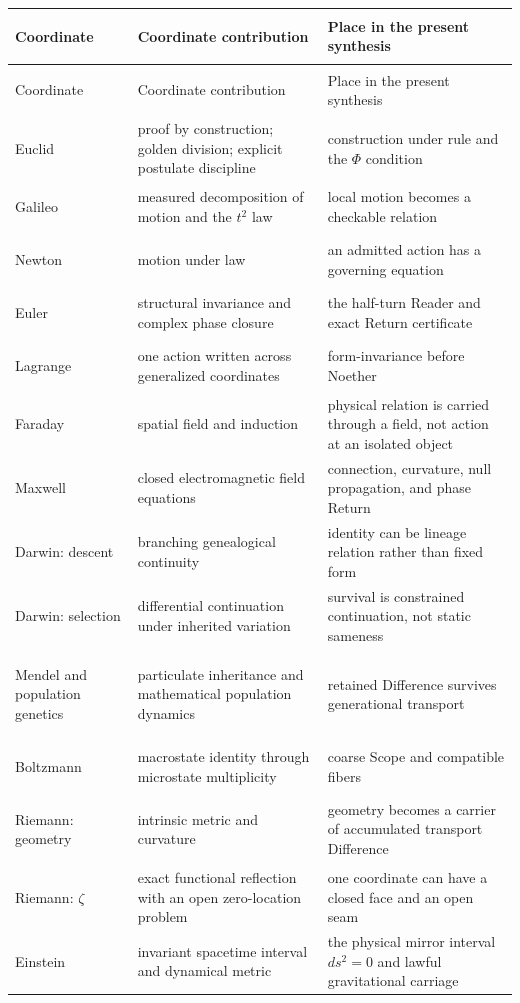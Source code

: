 \documentclass[11pt]{article}
\begin{document}
\small
\begin{longtable}{@{}>{\bfseries\raggedright\arraybackslash}p{}>{\raggedright\arraybackslash}p{}>{\raggedright\arraybackslash}p{}@{}}
\toprule
Coordinate & Coordinate contribution & Place in the present synthesis\\
\midrule
\endfirsthead
\toprule
Coordinate & Coordinate contribution & Place in the present synthesis\\
\midrule
\endhead
Euclid & proof by construction; golden division; explicit postulate discipline & construction under rule and the $\Phi$ condition\\
Galileo & measured decomposition of motion and the $t^2$ law & local motion becomes a checkable relation\\
Newton & motion under law & an admitted action has a governing equation\\
Euler & structural invariance and complex phase closure & the half-turn Reader and exact Return certificate\\
Lagrange & one action written across generalized coordinates & form-invariance before Noether\\
Faraday & spatial field and induction & physical relation is carried through a field, not action at an isolated object\\
Maxwell & closed electromagnetic field equations & connection, curvature, null propagation, and phase Return\\
Darwin: descent & branching genealogical continuity & identity can be lineage relation rather than fixed form\\
Darwin: selection & differential continuation under inherited variation & survival is constrained continuation, not static sameness\\
Mendel and population genetics & particulate inheritance and mathematical population dynamics & retained Difference survives generational transport\\
Boltzmann & macrostate identity through microstate multiplicity & coarse Scope and compatible fibers\\
Riemann: geometry & intrinsic metric and curvature & geometry becomes a carrier of accumulated transport Difference\\
Riemann: $\zeta$ & exact functional reflection with an open zero-location problem & one coordinate can have a closed face and an open seam\\
Einstein & invariant spacetime interval and dynamical metric & the physical mirror interval $ds^2=0$ and lawful gravitational carriage\\

\end{longtable}
\end{document}
